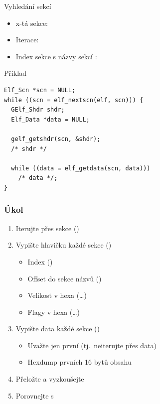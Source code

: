 \begin{frame}[fragile]{}{Vyhledání sekcí}

  \begin{itemize}
    \item x-tá sekce: 
    \item Iterace: 

    \pause

    \item Index sekce s názvy sekcí : \\
  \end{itemize}


  \begin{block}{Příklad}
  \begin{lstlisting}[aboveskip=2pt,belowskip=2pt]
Elf_Scn *scn = NULL;
while ((scn = elf_nextscn(elf, scn))) {
  GElf_Shdr shdr;
  Elf_Data *data = NULL;

  gelf_getshdr(scn, &shdr);
  /* shdr */

  while ((data = elf_getdata(scn, data)))
    /* data */;
}
  \end{lstlisting}
  \end{block}

\end{frame}

\begin{frame}
  \frametitle{Úkol}

  \begin{enumerate}
    \item Iterujte přes sekce ()
    \item Vypište hlavičku každé sekce ()
    \begin{itemize}
      \item Index ()
      \item Offset do sekce názvů ()
      \item Velikost v hexa (\dots)
      \item Flagy v hexa (\dots)
    \end{itemize}

    \item Vypište data každé sekce ()
    \begin{itemize}
      \item Uvažte jen první  (tj.\ neiterujte přes data)
      \item Hexdump prvních 16 bytů obsahu
    \end{itemize}

    \item Přeložte a vyzkoušejte
    \item Porovnejte s 
  \end{enumerate}

\end{frame}

